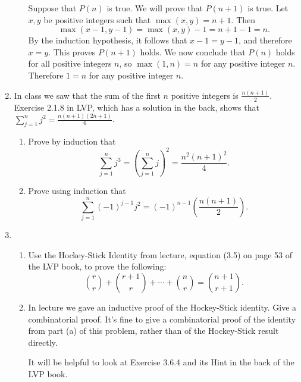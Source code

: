\documentclass[11pt]{article}
\begin{document}
\begin{enumerate}
\begin{enumerate}
Suppose that $P(n)$ is true.  We will prove that $P(n+1)$ is true.  Let $x,y$ be positive integers such that $\max(x,y) = n+1$.  Then 
\[
\max(x-1,y-1) = \max(x,y) -1 = n+1-1 = n.
\]
By the induction hypothesis, it follows that $x-1 = y-1$, and therefore $x=y$.  This proves $P(n+1)$ holds.  We now conclude that $P(n)$ holds for all positive integers $n$, so $\max(1,n) = n$ for any positive integer $n$. Therefore $1=n$ for any positive integer $n$.

\end{enumerate}



\item  In class we saw that the sum of the first $n$ positive integers is $\frac{n(n+1)}{2}$.  Exercise 2.1.8 in LVP, which has a solution in the back, shows that $\sum_{j=1}^n  j^2 = \frac{n(n+1)(2n+1)}{6}$. 
\begin{enumerate}
\item Prove by induction that 
\[
\sum_{j=1}^n j^3 = \left( \sum_{j=1}^n j \right)^2 = \frac{n^2 (n+1)^2}{4}.
\]
\item Prove using induction that 
\[
\sum_{j=1}^n (-1)^{j-1} j^2 = (-1)^{n-1} \left(\frac{n(n+1)}{2}\right).
\]
\end{enumerate}

\item 
\begin{enumerate} 
\item Use the Hockey-Stick Identity from lecture, equation (3.5) on page 53 of the LVP book, to prove the following:
\[ 
\binom{r}{r} + \binom{r+1}{r} + \cdots + \binom{n}{r} = \binom{n+1}{r+1}.
\]
\item In lecture we gave an inductive proof of the Hockey-Stick identity.  Give a combinatorial proof.  It's fine to give a combinatorial proof of the identity from part (a) of this problem, rather than of the Hockey-Stick result directly.

It will be helpful to look at Exercise 3.6.4 and its Hint in the back of the LVP book.
\end{enumerate}




\end{enumerate}
\end{document}
